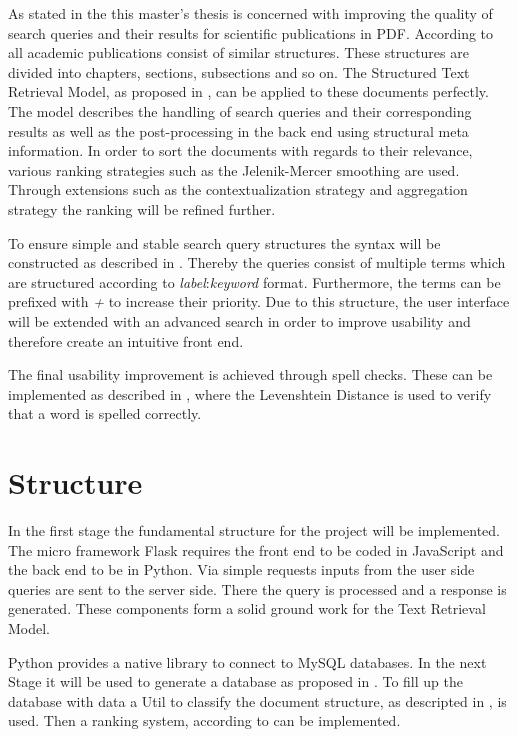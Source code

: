 \documentclass[a4paper, 12pt]{scrartcl}
\begin{document}
As stated in the  this master's thesis is concerned with improving the quality of search queries and their results for scientific
publications in PDF. According to \cite{KGJK14} all academic publications consist of similar structures. These structures are divided into chapters,
sections, subsections and so on. The Structured Text Retrieval Model, as proposed in \cite{RNBY99}, can be applied to these documents perfectly.
The model describes the handling of search queries and their corresponding results as well as the post-processing in the back end using structural meta information. 
In order to sort the documents with regards to their relevance, various ranking strategies such as the Jelenik-Mercer smoothing are used. Through extensions such as the 
contextualization strategy and aggregation strategy the ranking will be refined further.

To ensure simple and stable search query structures the syntax will be constructed as described in \cite{Coh03}. Thereby the queries consist of multiple terms
which are structured according to \textit{label}:\textit{keyword} format. Furthermore, the terms can be prefixed with \textit{+} to increase their priority. Due to
this structure, the user interface will be extended with an advanced search in order to improve usability and therefore create an intuitive front end.

The final usability improvement is achieved through spell checks. These can be implemented as described in \cite{SPCB13}, where the Levenshtein Distance is used to verify 
that a word is spelled correctly.

\section{Structure}

In the first stage the fundamental structure for the project will be implemented. The micro framework Flask requires the front end to be coded in JavaScript and the back end to be in Python. 
Via simple requests inputs from the user side queries are sent to the server side. There the query is processed and a response is generated. These components form a solid ground work 
for the Text Retrieval Model.

Python provides a native library to connect to MySQL databases. In the next Stage it will be used to generate a database as proposed in \cite{YA94}. To fill up the database with data a Util to classify 
the document structure, as descripted in \cite{KGJK14}, is used. Then a ranking system, according to \cite{MRS08, RNBY99} can be implemented.
\end{document}
